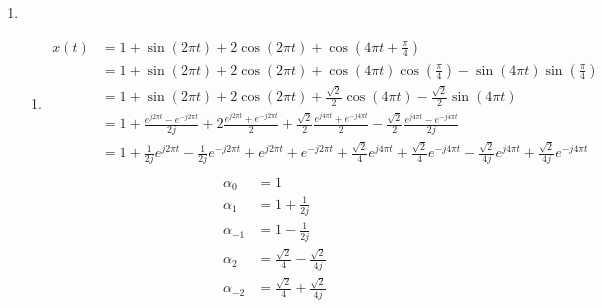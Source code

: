 \documentclass[10pt,a4paper, margin=1in]{article}
\begin{document}
\begin{enumerate}
\item %
    \begin{enumerate}   
    \item %
    \begin{align*}
        x(t) & = 1 + \sin(2\pi t) + 2\cos(2\pi t) + \cos(4\pi  t + \frac{\pi}{4}) \\
        & = 1 + \sin(2\pi t) + 2\cos(2\pi t) + \cos(4\pi  t)\cos(\frac{\pi}{4}) - \sin(4\pi  t)\sin(\frac{\pi}{4}) \\
        & = 1 + \sin(2\pi t) + 2\cos(2\pi t) + \frac{\sqrt{2}}{2}\cos(4\pi  t) - \frac{\sqrt{2}}{2}\sin(4\pi  t) \\
        & = 1 + \frac{e^{j2\pi t} - e^{-j2\pi t}}{2j} + 2\frac{e^{j2\pi t} + e^{-j2\pi t}}{2} + \frac{\sqrt{2}}{2}\frac{e^{j4\pi  t} + e^{-j4\pi  t}}{2} - \frac{\sqrt{2}}{2}\frac{e^{j4\pi  t} - e^{-j4\pi  t}}{2j} \\
        & = 1 + \frac{1}{2j}e^{j2\pi t} - \frac{1}{2j}e^{-j2\pi t} + e^{j2\pi t} + e^{-j2\pi t} + \frac{\sqrt{2}}{4}e^{j4\pi  t} + \frac{\sqrt{2}}{4}e^{-j4\pi  t} - \frac{\sqrt{2}}{4j}e^{j4\pi  t} + \frac{\sqrt{2}}{4j}e^{-j4\pi  t} \\
    \end{align*}
    \begin{align*}
        \alpha_0 & = 1 \\
        \alpha_1 & = 1 + \frac{1}{2j}\\
        \alpha_{-1} & = 1 - \frac{1}{2j}\\
        \alpha_2 & = \frac{\sqrt{2}}{4} - \frac{\sqrt{2}}{4j}\\
        \alpha_{-2} & = \frac{\sqrt{2}}{4} + \frac{\sqrt{2}}{4j}\\
    \end{align*}

    \begin{center}
         \\


\end{center}
\end{enumerate}
\end{enumerate}
\end{document}
